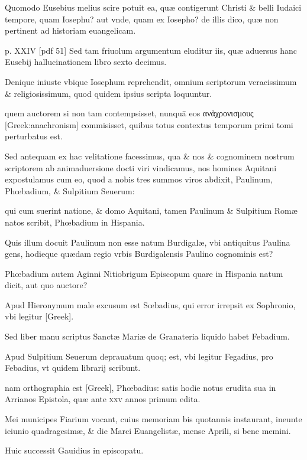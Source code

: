 \begin{parnumbers}
Quomodo Eusebius melius scire potuit ea, quæ contigerunt
Christi \& belli Iudaici tempore, quam Iosephu? aut vnde,
quam ex Iosepho? de illis dico, quæ non pertinent ad historiam euangelicam.



\clearpage
p. XXIV [pdf 51]
Sed tam friuolum argumentum eluditur iis, quæ aduersus
hanc Eusebij hallucinationem libro sexto decimus.

Denique iniuste
vbique Iosephum reprehendit, omnium scriptorum veracissimum
\& religiosissimum, quod quidem ipsius scripta loquuntur.

quem
auctorem si non tam contempsisset, nunquā eos
 \textgreek{ανἀχρονισμους [Greek:anachronism]} commisisset,
quibus totus contextus temporum primi tomi perturbatus
est.

Sed antequam ex hac velitatione facessimus, qua \& nos \& cognominem
nostrum scriptorem ab animaduersione docti viri vindicamus,
nos homines Aquitani expostulamus cum eo, quod a nobis
tres summos viros abdixit, Paulinum, Phœbadium, \& Sulpitium
Seuerum:

qui cum suerint natione, \& domo Aquitani, tamen
Paulinum \& Sulpitium Romæ natos scribit, Phœbadium in Hispania.

Quis illum docuit Paulinum non esse natum Burdigalæ, vbi
antiquitus Paulina gens, hodieque quædam regio vrbis Burdigalensis
Paulino cognominis est?

Phœbadium autem Aginni Nitiobrigum
Episcopum quare in Hispania natum dicit, aut quo auctore?

Apud Hieronymum male excusum est Sœbadius, qui error irrepsit
ex Sophronio, vbi legitur \textgreek{[Greek]}.

Sed liber manu scriptus
Sanctæ Mariæ de Granateria liquido habet Febadium.

Apud Sulpitium
Seuerum deprauatum quoq; est, vbi legitur Fegadius, pro
Febadius, vt quidem librarij scribunt.

nam orthographia est \textgreek{[Greek]},
Phœbadius: satis hodie notus erudita sua in Arrianos Epistola,
quæ ante \textsc{xxv} annos primum edita.

Mei municipes Fiarium vocant,
cuius memoriam bis quotannis instaurant, ineunte ieiunio
quadragesimæ, \& die Marci Euangelistæ, mense Aprili, si bene
memini.

Huic successit Gauidius in episcopatu.


\end{parnumbers}
